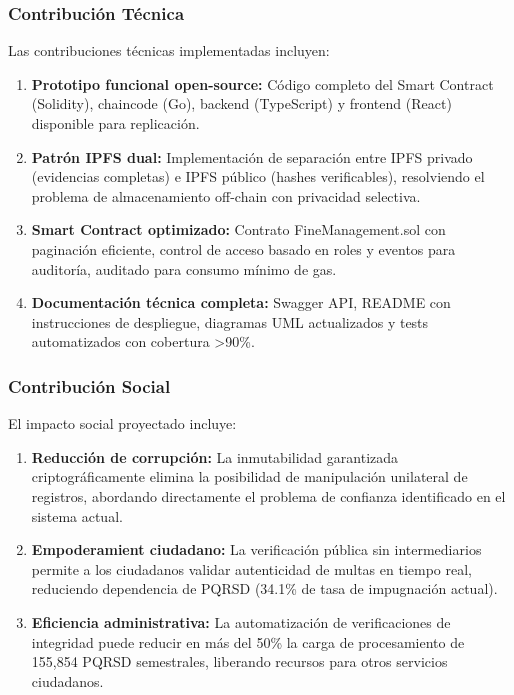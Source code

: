 \subsubsection{Contribución Técnica}

Las contribuciones técnicas implementadas incluyen:

\begin{enumerate}
    \item \textbf{Prototipo funcional open-source:} Código completo del Smart Contract (Solidity), chaincode (Go), backend (TypeScript) y frontend (React) disponible para replicación.
    
    \item \textbf{Patrón IPFS dual:} Implementación de separación entre IPFS privado (evidencias completas) e IPFS público (hashes verificables), resolviendo el problema de almacenamiento off-chain con privacidad selectiva.
    
    \item \textbf{Smart Contract optimizado:} Contrato FineManagement.sol con paginación eficiente, control de acceso basado en roles y eventos para auditoría, auditado para consumo mínimo de gas.
    
    \item \textbf{Documentación técnica completa:} Swagger API, README con instrucciones de despliegue, diagramas UML actualizados y tests automatizados con cobertura >90\%.
\end{enumerate}

\subsubsection{Contribución Social}

El impacto social proyectado incluye:

\begin{enumerate}
    \item \textbf{Reducción de corrupción:} La inmutabilidad garantizada criptográficamente elimina la posibilidad de manipulación unilateral de registros, abordando directamente el problema de confianza identificado en el sistema actual.
    
    \item \textbf{Empoderamient ciudadano:} La verificación pública sin intermediarios permite a los ciudadanos validar autenticidad de multas en tiempo real, reduciendo dependencia de PQRSD (34.1\% de tasa de impugnación actual).
    
    \item \textbf{Eficiencia administrativa:} La automatización de verificaciones de integridad puede reducir en más del 50\% la carga de procesamiento de 155,854 PQRSD semestrales, liberando recursos para otros servicios ciudadanos.
\end{enumerate}

